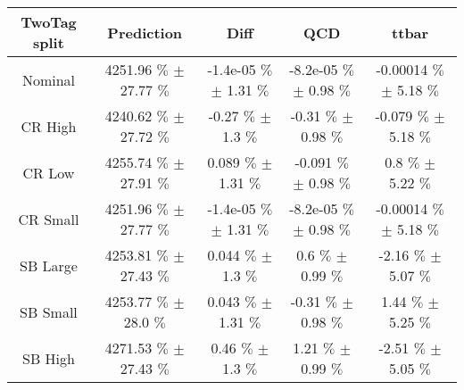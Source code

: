 \begin{footnotesize} 
\begin{tabular}{c|c|c|c|c} 
 TwoTag split & Prediction & Diff & QCD & ttbar \\ 
\hline\hline 
 
Nominal & 4251.96 $\%$  $\pm$ 27.77 $\%$  & -1.4e-05 $\%$  $\pm$ 1.31 $\%$  & -8.2e-05 $\%$  $\pm$ 0.98 $\%$  & -0.00014 $\%$  $\pm$ 5.18 $\%$ \\ 
CR High & 4240.62 $\%$  $\pm$ 27.72 $\%$  & -0.27 $\%$  $\pm$ 1.3 $\%$  & -0.31 $\%$  $\pm$ 0.98 $\%$  & -0.079 $\%$  $\pm$ 5.18 $\%$ \\ 
CR Low & 4255.74 $\%$  $\pm$ 27.91 $\%$  & 0.089 $\%$  $\pm$ 1.31 $\%$  & -0.091 $\%$  $\pm$ 0.98 $\%$  & 0.8 $\%$  $\pm$ 5.22 $\%$ \\ 
CR Small & 4251.96 $\%$  $\pm$ 27.77 $\%$  & -1.4e-05 $\%$  $\pm$ 1.31 $\%$  & -8.2e-05 $\%$  $\pm$ 0.98 $\%$  & -0.00014 $\%$  $\pm$ 5.18 $\%$ \\ 
SB Large & 4253.81 $\%$  $\pm$ 27.43 $\%$  & 0.044 $\%$  $\pm$ 1.3 $\%$  & 0.6 $\%$  $\pm$ 0.99 $\%$  & -2.16 $\%$  $\pm$ 5.07 $\%$ \\ 
SB Small & 4253.77 $\%$  $\pm$ 28.0 $\%$  & 0.043 $\%$  $\pm$ 1.31 $\%$  & -0.31 $\%$  $\pm$ 0.98 $\%$  & 1.44 $\%$  $\pm$ 5.25 $\%$ \\ 
SB High & 4271.53 $\%$  $\pm$ 27.43 $\%$  & 0.46 $\%$  $\pm$ 1.3 $\%$  & 1.21 $\%$  $\pm$ 0.99 $\%$  & -2.51 $\%$  $\pm$ 5.05 $\%$ \\ 
 
\hline\hline 
\end{tabular} 
\end{footnotesize} 
\newline 
